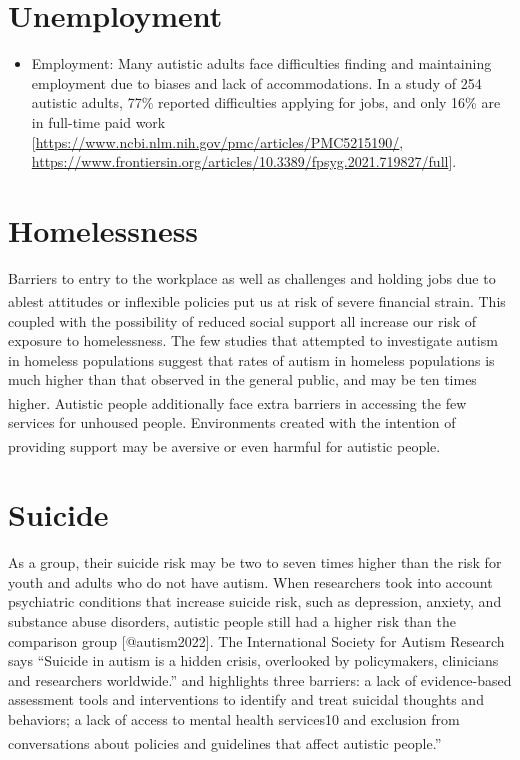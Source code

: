 \documentclass[
  letterpaper,
  DIV=11,
  numbers=noendperiod]{scrreprt}
\providecommand{\tightlist}{%
  \setlength{\itemsep}{0pt}\setlength{\parskip}{0pt}}\usepackage{longtable,booktabs,array}
\begin{document}
\section{Unemployment}\label{sec-unemployment}

\begin{itemize}
\tightlist
\item
  Employment: Many autistic adults face difficulties finding and
  maintaining employment due to biases and lack of accommodations. In a
  study of 254 autistic adults, 77\% reported difficulties applying for
  jobs, and only 16\% are in full-time paid work
  {[}\url{https://www.ncbi.nlm.nih.gov/pmc/articles/PMC5215190/},
  \url{https://www.frontiersin.org/articles/10.3389/fpsyg.2021.719827/full}{]}.
\end{itemize}

\section{Homelessness}\label{sec-homelessness}

Barriers to entry to the workplace as well as challenges and holding
jobs due to ablest attitudes or inflexible policies put us at risk of
severe financial strain\textsuperscript{}.
This coupled with the possibility of reduced social support all increase
our risk of exposure to homelessness. The few studies that attempted to
investigate autism in homeless populations suggest that rates of autism
in homeless populations is much higher than that observed in the general
public, and may be ten times
higher\textsuperscript{}. Autistic
people additionally face extra barriers in accessing the few services
for unhoused people. Environments created with the intention of
providing support may be aversive or even harmful for autistic
people\textsuperscript{}.

\section{Suicide}\label{sec-suicide}

As a group, their suicide risk may be two to seven times higher than the
risk for youth and adults who do not have autism. When researchers took
into account psychiatric conditions that increase suicide risk, such as
depression, anxiety, and substance abuse disorders, autistic people
still had a higher risk than the comparison group
{[}@\textbar autism2022{]}. The International Society for Autism
Research says ``Suicide in autism is a hidden crisis, overlooked by
policymakers, clinicians and researchers worldwide.'' and highlights
three barriers: a lack of evidence-based assessment tools and
interventions to identify and treat suicidal thoughts and behaviors; a
lack of access to mental health services10 and exclusion from
conversations about policies and guidelines that affect autistic
people.''\textsuperscript{}
\end{document}
